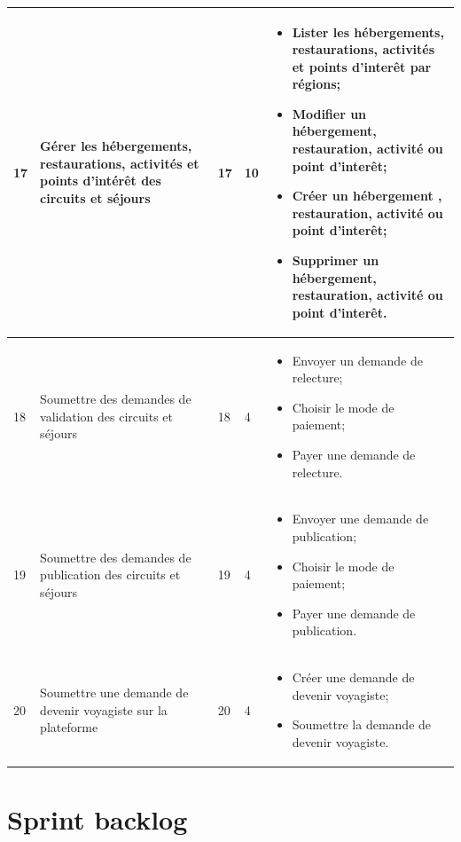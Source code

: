 \documentclass[12pt]{report}
\begin{document}
\begin{longtable}{|p{1cm}|p{3cm}|p{2cm}|p{2cm}|p{6cm}|}
						\\
						\hline
						 17&Gérer les hébergements, restaurations, activités et points d'intérêt des circuits et séjours&17&10&
						\begin{itemize}
							\item Lister les hébergements, restaurations, activités et points d'interêt par régions;
							\item Modifier un hébergement, restauration, activité ou point d'interêt;
							\item Créer un hébergement , restauration, activité ou point d'interêt;
							\item Supprimer un hébergement, restauration, activité ou point d'interêt.
						\end{itemize}
						\\
						\hline
						 18&Soumettre des demandes de validation des circuits et séjours&18&4&
						\begin{itemize}
							\item Envoyer un demande de relecture;
							\item Choisir le mode de paiement;
							\item Payer une demande de relecture.
						\end{itemize}
						\\
						\hline
						 19&Soumettre des demandes de publication des circuits et séjours&19&4&
						\begin{itemize}
							\item Envoyer une demande de publication;
							\item Choisir le mode de paiement;
							\item Payer une demande de publication.
						\end{itemize}
						\\
						\hline
						 20&Soumettre une demande de devenir voyagiste sur la plateforme&20&4&
						\begin{itemize}
							\item Créer une demande de devenir voyagiste;
							\item Soumettre la demande de devenir voyagiste.
						\end{itemize}
						\\
						\hline
				    \end{longtable}

				\section{Sprint backlog}
	
\end{document}
